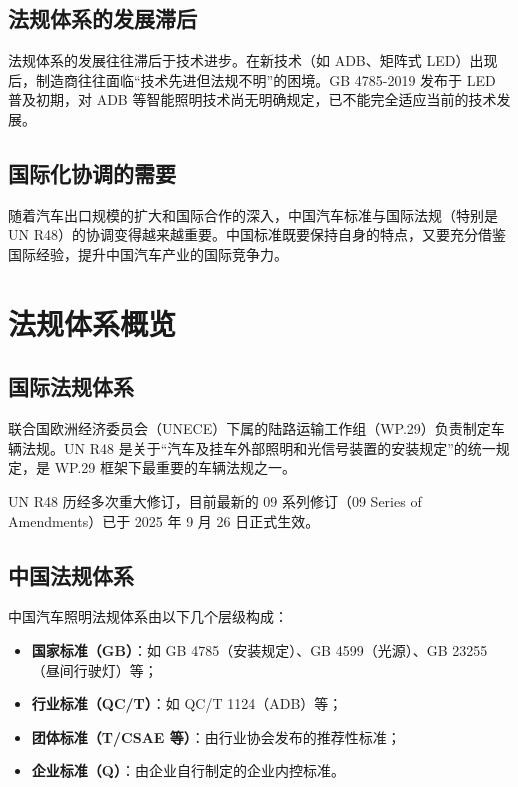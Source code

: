 \subsection{法规体系的发展滞后}

法规体系的发展往往滞后于技术进步。在新技术（如 ADB、矩阵式 LED）出现后，制造商往往面临“技术先进但法规不明”的困境。GB 4785-2019 发布于 LED 普及初期，对 ADB 等智能照明技术尚无明确规定，已不能完全适应当前的技术发展。

\subsection{国际化协调的需要}

随着汽车出口规模的扩大和国际合作的深入，中国汽车标准与国际法规（特别是 UN R48）的协调变得越来越重要。中国标准既要保持自身的特点，又要充分借鉴国际经验，提升中国汽车产业的国际竞争力。

\section{法规体系概览}

\subsection{国际法规体系}

联合国欧洲经济委员会（UNECE）下属的陆路运输工作组（WP.29）负责制定车辆法规。UN R48 是关于“汽车及挂车外部照明和光信号装置的安装规定”的统一规定，是 WP.29 框架下最重要的车辆法规之一。

UN R48 历经多次重大修订，目前最新的 09 系列修订（09 Series of Amendments）已于 2025 年 9 月 26 日正式生效。

\subsection{中国法规体系}

中国汽车照明法规体系由以下几个层级构成：

\begin{itemize}[leftmargin=2em]
    \item \textbf{国家标准（GB）}：如 GB 4785（安装规定）、GB 4599（光源）、GB 23255（昼间行驶灯）等；
    \item \textbf{行业标准（QC/T）}：如 QC/T 1124（ADB）等；
    \item \textbf{团体标准（T/CSAE 等）}：由行业协会发布的推荐性标准；
    \item \textbf{企业标准（Q）}：由企业自行制定的企业内控标准。
\end{itemize}

